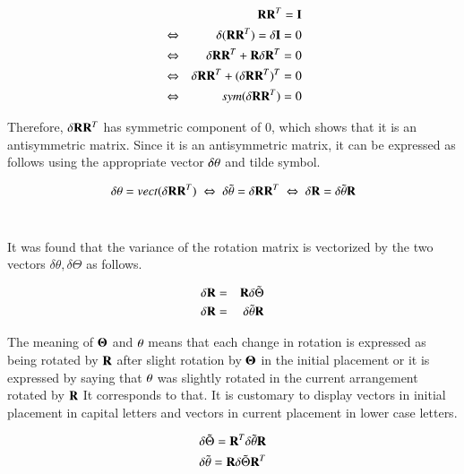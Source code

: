 \begin{eqnarray}
&&  \mathbf{R} \mathbf{R}^T = \mathbf{I}\\
&\Leftrightarrow& \delta(\mathbf{R}\mathbf{R}^T) = \delta\mathbf{I} = 0\\
&\Leftrightarrow& \delta\mathbf{R}\mathbf{R}^T + \mathbf{R}\delta\mathbf{R}^T = 0\\
&\Leftrightarrow& \delta\mathbf{R}\mathbf{R}^T + (\delta\mathbf{R}\mathbf{R}^T)^T = 0\\
&\Leftrightarrow& sym(\delta\mathbf{R}\mathbf{R}^T) = 0
\end{eqnarray}


Therefore, $\delta\mathbf{R}\mathbf{R}^T$ has symmetric component of 0, which shows that it is an antisymmetric matrix. Since it is an antisymmetric matrix, it can be expressed as follows using the appropriate vector $\delta\mathbf{\theta}$ and tilde symbol.

\begin{equation}
\delta\theta = vect(\delta\mathbf{R}\mathbf{R}^T) \;\Leftrightarrow\; \delta\tilde{\theta} = \delta\mathbf{R}\mathbf{R}^T \;\Leftrightarrow\; \delta\mathbf{R} = \delta\tilde{\theta}\mathbf{R}
\end{equation}
\ \ \ \

It was found that the variance of the rotation matrix is ​​vectorized by the two vectors $\delta\theta,\delta\Theta$ as follows.

\begin{tcolorbox}[title=two vector notations for variational rotation]
\begin{eqnarray}
\delta\mathbf{R} &=& \mathbf{R}\delta\tilde{\Theta}\\
\delta\mathbf{R} &=& \delta\tilde{\theta}\mathbf{R}
\end{eqnarray}
\end{tcolorbox}

The meaning of $\mathbf{\Theta}$ and $\mathbf{\theta}$ means that each change in rotation is expressed as being rotated by $\mathbf{R}$ after slight rotation by $\mathbf{\Theta}$ in the initial placement or it is expressed by saying that $\mathbf{\theta}$ was slightly rotated in the current arrangement rotated by $\mathbf{R}$ It corresponds to that. It is customary to display vectors in initial placement in capital letters and vectors in current placement in lower case letters.

\begin{eqnarray}
\delta\tilde{\Theta} = \mathbf{R}^T\delta\tilde{\theta}\mathbf{R}\\
\delta\tilde{\theta} = \mathbf{R}\delta\tilde{\Theta}\mathbf{R}^T
\end{eqnarray}




